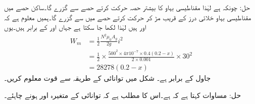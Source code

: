 حل:
چونکہ  ہے لہٰذا مقناطیسی بہاو کا بیشتر حصہ حرکت کرتے حصے سے گزرے گا۔ساکن حصے میں مقناطیسی بہاو خلائی درز کے قریب مڑ کر حرکت کرتے حصے میں سے گزرے گا۔ہمیں معلوم ہے کہ   اور  ہیں لہٰذا  لکھا جا سکتا ہے جہاں  اور  کے برابر ہیں۔یوں
\begin{align*}
W_m&=\frac{1}{2} \frac{N^2 \mu_0 A_g}{2 g } i^2\\
&=\frac{1}{2} \times \frac{500^2 \times 4 \pi 10^{-7} \times 0.4 (0.2-x)}{2 \times 0.001} \times 30^2\\
&=28278 (0.2-x)
\end{align*}
جاول کے برابر ہے۔
%
 شکل  میں توانائی کے طریقہ سے قوت  معلوم کریں۔

حل:
	 مساوات   کہتا ہے کہ  ہے۔اس کا مطلب ہے کہ توانائی کے متغیرہ  اور  ہونے چاہئے۔

